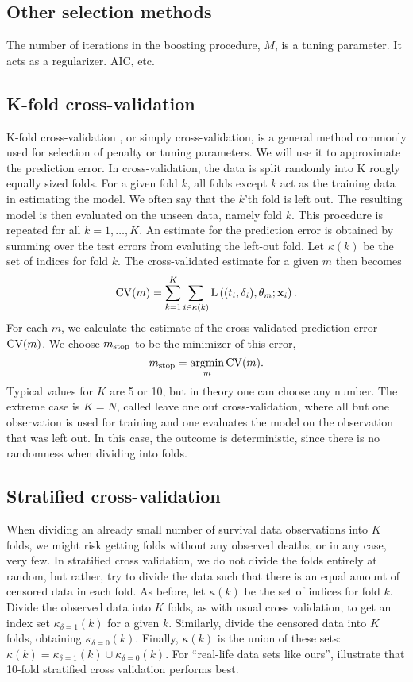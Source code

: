 \subsection{Other selection methods}
The number of iterations in the boosting procedure, $M$, is a tuning parameter. It acts as a regularizer. AIC, etc.

\subsection{K-fold cross-validation}
K-fold cross-validation \citep{lachenbruch}, or simply cross-validation, is a general method commonly used for selection of penalty or tuning parameters. We will use it to approximate the prediction error. In cross-validation, the data is split randomly into K rougly equally sized folds. For a given fold $k$, all folds except $k$ act as the training data in estimating the model. We often say that the $k$'th fold is left out. The resulting model is then evaluated on the unseen data, namely fold $k$. This procedure is repeated for all $k=1,\ldots,K$. An estimate for the prediction error is obtained by summing over the test errors from evaluting the left-out fold. Let $\kappa(k)$ be the set of indices for fold $k$. The cross-validated estimate for a given $m$ then becomes
\begin{equation}
    \operatorname{CV}(m)=\sum_{k=1}^K\sum_{i\in\kappa(k)}\operatorname{L}\left((t_i,\delta_i),\theta_m;\mathbf{x}_i\right).
\end{equation}
For each $m$, we calculate the estimate of the cross-validated prediction error $\operatorname{CV}(m)$. We choose $m_{\text{stop}}$ to be the minimizer of this error,
\begin{equation}
    m_{\text{stop}}=\operatorname*{argmin}_{m}\operatorname{CV}(m).
\end{equation}
Typical values for $K$ are 5 or 10, but in theory one can choose any number. The extreme case is $K=N$, called leave one out cross-validation, where all but one observation is used for training and one evaluates the model on the observation that was left out. In this case, the outcome is deterministic, since there is no randomness when dividing into folds.

\subsection{Stratified cross-validation}
When dividing an already small number of survival data observations into $K$ folds, we might risk getting folds without any observed deaths, or in any case, very few. In stratified cross validation, we do not divide the folds entirely at random, but rather, try to divide the data such that there is an equal amount of censored data in each fold.
As before, let $\kappa(k)$ be the set of indices for fold $k$. Divide the observed data into $K$ folds, as with usual cross validation, to get an index set $\kappa_{\delta=1}(k)$ for a given $k$. Similarly, divide the censored data into $K$ folds, obtaining $\kappa_{\delta=0}(k)$. Finally, $\kappa(k)$ is the union of these sets: $\kappa(k)=\kappa_{\delta=1}(k)\cup\kappa_{\delta=0}(k)$. For ``real-life data sets like ours'', \citet{kohavi} illustrate that 10-fold stratified cross validation performs best.

